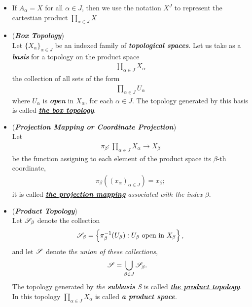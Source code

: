 \documentclass[11pt]{article}
\begin{document}
\begin{itemize}
\item \begin{remark}
If $A_{\alpha} = X$ for all $\alpha \in J$, then we use the notation $X^{J}$ to represent the cartestian product $\prod_{\alpha \in J}X$
\end{remark}

\item \begin{definition} (\emph{\textbf{Box Topology}})\\
Let $\{X_{\alpha}\}_{\alpha \in J}$ be an indexed family of \emph{\textbf{topological spaces}}. Let us take as a \emph{\textbf{basis}} for a topology on the product space
\begin{align*}
\prod_{\alpha \in J} X_{\alpha}
\end{align*}
the collection of all sets of the form
\begin{align*}
\prod_{\alpha \in J} U_{\alpha}
\end{align*}
where $U_{\alpha}$ is \emph{\textbf{open}} in $X_{\alpha}$, for each $\alpha \in J$. The topology generated by this basis is called \underline{\emph{\textbf{the box topology}}}.
\end{definition}

\item \begin{definition} (\emph{\textbf{Projection Mapping or Coordinate Projection}})\\
Let
\begin{align*}
\pi_{\beta}: \prod_{\alpha \in J} X_{\alpha} \rightarrow X_{\beta}
\end{align*}
be the function assigning to each element of the product space its $\beta$-th coordinate,
\begin{align*}
\pi_{\beta}((x_{\alpha})_{\alpha \in J}) = x_{\beta};
\end{align*}
it is called \emph{\underline{\textbf{the projection mapping}} associated with the index $\beta$}.
\end{definition}

\item \begin{definition} (\emph{\textbf{Product Topology}})\\
Let ${\mathscr S}_\beta$ denote the collection
\begin{align*}
{\mathscr S}_\beta = \left\{ \pi_\beta^{-1}(U_\beta): U_{\beta}\text{ open in }X_\beta\right\},
\end{align*}
and let ${\mathscr S}$ denote \emph{the union of these collections},
\begin{align*}
{\mathscr S} &= \bigcup_{\beta \in J} {\mathscr S}_\beta.
\end{align*}
The topology generated by \emph{the \textbf{subbasis} S} is called \underline{\emph{\textbf{the product topology}}}. In this 
topology $\prod_{\alpha \in J} X_{\alpha}$ is called \emph{\textbf{a product space}}.
\end{definition}


\end{itemize}
\end{document}
